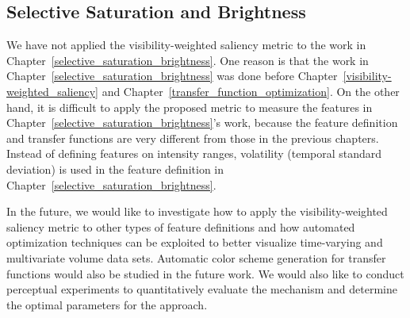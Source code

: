 \subsection{Selective Saturation and Brightness}
We have not applied the visibility-weighted saliency metric to the work in Chapter~\ref{selective_saturation_brightness}. One reason is that the work in Chapter~\ref{selective_saturation_brightness} was done before Chapter~\ref{visibility-weighted_saliency} and Chapter~\ref{transfer_function_optimization}. On the other hand, it is difficult to apply the proposed metric to measure the features in Chapter~\ref{selective_saturation_brightness}'s work, because the feature definition and transfer functions are very different from those in the previous chapters. Instead of defining features on intensity ranges, volatility (temporal standard deviation) is used in the feature definition in Chapter~\ref{selective_saturation_brightness}.

In the future, we would like to investigate how to apply the visibility-weighted saliency metric to other types of feature definitions and how automated optimization techniques can be exploited to better visualize time-varying and multivariate volume data sets. Automatic color scheme generation \cite{zhou_automatic_2009} for transfer functions would also be studied in the future work.
We would also like to conduct perceptual experiments to quantitatively evaluate the mechanism and determine the optimal parameters for the approach.


